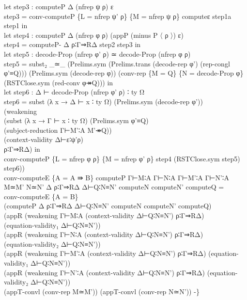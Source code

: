 \begin{proposition}
\begin{enumerate}
{\begin{code}
{\>      let step3 : computeP Δ (nfrep ψ ρ) ε\<\\
\>          step3 = conv-computeP \{L = nfrep ψ' ρ\} \{M = nfrep ψ ρ\} computeε step1a step1 in\<\\
\>      let step4 : computeP Δ (nfrep φ ρ) (appP (minus P 〈 ρ 〉) ε)\<\\
\>          step4 = computeP- Δ ρ∶Γ⇒RΔ step2 step3 in \<\\
\>      let step5 : decode-Prop (nfrep φ' ρ) ≃ decode-Prop (nfrep φ ρ)\<\\
\>          step5 = subst₂ \_≃\_ (Prelims.sym (Prelims.trans (decode-rep φ') (rep-congl φ'≡Q))) (Prelims.sym (decode-rep φ)) (conv-rep \{M = Q\} \{N = decode-Prop φ\} \<\\
\>            (RSTClose.sym (red-conv φ↠Q))) in\<\\
\>      let step6 : Δ ⊢ decode-Prop (nfrep φ' ρ) ∶ ty Ω\<\\
\>          step6 = subst (λ x → Δ ⊢ x ∶ ty Ω) (Prelims.sym (decode-rep φ')) \<\\
\>                (weakening \<\\
\>                  (subst (λ x → Γ ⊢ x ∶ ty Ω) (Prelims.sym φ'≡Q) \<\\
\>                  (subject-reduction Γ⊢M'∶A M'↠Q)) \<\\
\>                (context-validity Δ⊢ε∶ψ'ρ) \<\\
\>                ρ∶Γ⇒RΔ) in\<\\
\>      conv-computeP \{L = nfrep φ ρ\} \{M = nfrep φ' ρ\} step4 (RSTClose.sym step5) step6))\<\\
\>conv-computeE \{A = A ⇛ B\} computeP Γ⊢M∶A Γ⊢N∶A Γ⊢M'∶A Γ⊢N'∶A M≃M' N≃N' Δ ρ∶Γ⇒RΔ Δ⊢Q∶N≡N' computeN computeN' computeQ = \<\\
\>  conv-computeE \{A = B\} \<\\
\>  (computeP Δ ρ∶Γ⇒RΔ Δ⊢Q∶N≡N' computeN computeN' computeQ) \<\\
\>    (appR (weakening Γ⊢M∶A (context-validity Δ⊢Q∶N≡N') ρ∶Γ⇒RΔ) \<\\
\>      (equation-validity₁ Δ⊢Q∶N≡N')) \<\\
\>    (appR (weakening Γ⊢N∶A (context-validity Δ⊢Q∶N≡N') ρ∶Γ⇒RΔ) \<\\
\>      (equation-validity₂ Δ⊢Q∶N≡N'))\<\\
\>    (appR (weakening Γ⊢M'∶A (context-validity Δ⊢Q∶N≡N') ρ∶Γ⇒RΔ) (equation-validity₁ Δ⊢Q∶N≡N')) \<\\
\>    (appR (weakening Γ⊢N'∶A (context-validity Δ⊢Q∶N≡N') ρ∶Γ⇒RΔ) (equation-validity₂ Δ⊢Q∶N≡N')) \<\\
\>    (appT-convl (conv-rep M≃M')) (appT-convl (conv-rep N≃N')) -\}}\<%
\\
\>\<%
\end{code}
}


\end{enumerate}
\end{proposition}
